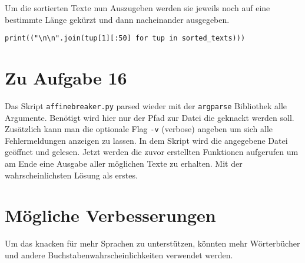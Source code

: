 \documentclass[12pt]{article}
\begin{document}
Um die sortierten Texte nun Auszugeben werden sie jeweils noch auf eine bestimmte Länge gekürzt und dann nacheinander ausgegeben.
\begin{lstlisting}
print(("\n\n".join(tup[1][:50] for tup in sorted_texts)))
\end{lstlisting}

\section{Zu Aufgabe 16}

Das Skript \texttt{affinebreaker.py} parsed wieder mit der \texttt{argparse} Bibliothek alle Argumente. Benötigt wird hier nur der Pfad zur Datei die geknackt werden soll. Zusätzlich kann man die optionale Flag \texttt{-v} (verbose) angeben um sich alle Fehlermeldungen anzeigen zu lassen. In dem Skript wird die angegebene Datei geöffnet und gelesen. Jetzt werden die zuvor erstellten Funktionen aufgerufen um am Ende eine Ausgabe aller möglichen Texte zu erhalten. Mit der wahrscheinlichsten Lösung als erstes.

\section{Mögliche Verbesserungen}

Um das knacken für mehr Sprachen zu unterstützen, könnten mehr Wörterbücher und andere Buchstabenwahrscheinlichkeiten verwendet werden.
\end{document}
